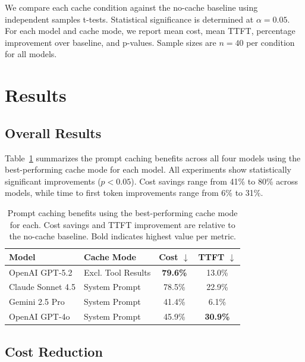 \documentclass{article}
\theoremstyle{plain}
\theoremstyle{definition}
\theoremstyle{remark}
\begin{document}
We compare each cache condition against the no-cache baseline using independent samples t-tests. Statistical significance is determined at $\alpha = 0.05$. For each model and cache mode, we report mean cost, mean TTFT, percentage improvement over baseline, and p-values. Sample sizes are $n = 40$ per condition for all models.

\section{Results}
\label{sec:results}



\subsection{Overall Results}
\label{subsec:overall_results}

Table~\ref{tab:summary_results} summarizes the prompt caching benefits across all four models using the best-performing cache mode for each model. All experiments show statistically significant improvements ($p < 0.05$). Cost savings range from 41\% to 80\% across models, while time to first token improvements range from 6\% to 31\%.

\begin{table}[t]
\caption{Prompt caching benefits using the best-performing cache mode for each. Cost savings and TTFT improvement are relative to the no-cache baseline. Bold indicates highest value per metric.}
\label{tab:summary_results}
\centering
\small
\begin{tabular}{llcc}
\toprule
\textbf{Model} & \textbf{Cache Mode} & \textbf{Cost $\downarrow$} & \textbf{TTFT $\downarrow$} \\
\midrule
OpenAI GPT-5.2 & Excl. Tool Results & \textbf{79.6\%} & 13.0\% \\
Claude Sonnet 4.5 & System Prompt & 78.5\% & 22.9\% \\
Gemini 2.5 Pro & System Prompt & 41.4\% & 6.1\% \\
OpenAI GPT-4o & System Prompt & 45.9\% & \textbf{30.9\%} \\
\bottomrule
\end{tabular}
\end{table}

\subsection{Cost Reduction}
\label{subsec:cost_results}
\end{document}
